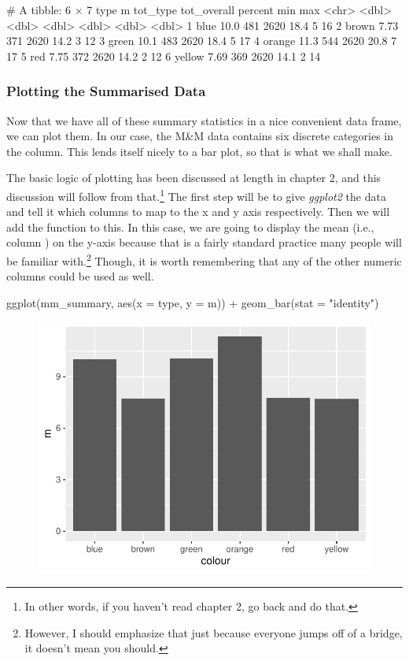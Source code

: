\begin{outR}
# A tibble: 6 × 7
  type       m tot_type tot_overall percent   min   max
  <chr>  <dbl>    <dbl>       <dbl>   <dbl> <dbl> <dbl>
1 blue   10.0       481        2620    18.4     5    16
2 brown   7.73      371        2620    14.2     3    12
3 green  10.1       483        2620    18.4     5    17
4 orange 11.3       544        2620    20.8     7    17
5 red     7.75      372        2620    14.2     2    12
6 yellow  7.69      369        2620    14.1     2    14
\end{outR}

\subsubsection{Plotting the Summarised Data}

Now that we have all of these summary statistics in a nice convenient data frame, we can plot them. In our case, the M\&M data contains six discrete categories in the  column. This lends itself nicely to a bar plot, so that is what we shall make.

The basic logic of plotting has been discussed at length in chapter 2, and this discussion will follow from that.\footnote{In other words, if you haven't read chapter 2, go back and do that.} The first step will be to give \textit{ggplot2} the data and tell it which columns to map to the x and y axis respectively. Then we will add the  function to this. In this case, we are going to display the mean (i.e., column ) on the y-axis because that is a fairly standard practice many people will be familiar with.\footnote{However, I should emphasize that just because everyone jumps off of a bridge, it doesn't mean you should.} Though, it is worth remembering that any of the other numeric columns could be used as well.

\begin{inR}
ggplot(mm_summary, aes(x = type, y = m)) +
  geom_bar(stat = "identity")
\end{inR}

\vspace{2em}

\begin{figure}[H]
\includegraphics[scale = .75]{graphics/ch3Figs/bar_1.pdf}
\end{figure}

